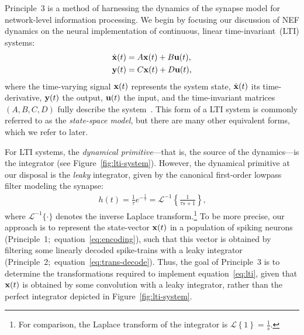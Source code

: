 Principle~3 is a method of harnessing the dynamics of the synapse model for network-level information processing.
We begin by focusing our discussion of NEF dynamics on the neural implementation of continuous, linear time-invariant~(LTI) systems:
\begin{equation} \label{eq:lti}
\begin{split}
\dot{\mathbf{x}}(t) &= A\mathbf{x}(t) + B\mathbf{u}(t) \text{,} \\
\mathbf{y}(t) &= C\mathbf{x}(t) + D\mathbf{u}(t) \text{,}
\end{split}
\end{equation}
where the time-varying signal $\mathbf{x}(t)$ represents the system state, $\dot{\mathbf{x}}(t)$ its time-derivative, $\mathbf{y}(t)$ the output, $\mathbf{u}(t)$ the input, and the time-invariant matrices $(A\text{,}\, B\text{,}\, C\text{,}\, D)$ fully describe the system~\citep{brogan1982modern}.
This form of a LTI system is commonly referred to as the \emph{state-space model}, but there are many other equivalent forms, which we refer to later.

For LTI systems, the \emph{dynamical primitive}---that is, the source of the dynamics---is the integrator (see Figure~\ref{fig:lti-system}).
However, the dynamical primitive at our disposal is the \emph{leaky} integrator, given by the canonical first-order lowpass filter modeling the synapse:
\begin{align} \label{eq:lowpass}
h(t) = \frac{1}{\tau} e^{-\frac{t}{\tau}} = \mathcal{L}^{-1}\left\{ \frac{1}{\tau s + 1} \right\} \text{,}
\end{align}
where $\mathcal{L}^{-1}\{ \cdot \}$ denotes the inverse Laplace transform.\footnote{
For comparison, the Laplace transform of the integrator is $\mathcal{L}\left\{ 1 \right\} = \frac{1}{s}$.}
To be more precise, our approach is to represent the state-vector $\mathbf{x}(t)$ in a population of spiking neurons (Principle~1;~equation~\ref{eq:encoding}), such that this vector is obtained by filtering some linearly decoded spike-trains with a leaky integrator (Principle~2;~equation~\ref{eq:trans-decode}).
Thus, the goal of Principle~3 is to determine the transformations required to implement equation~\ref{eq:lti}, given that $\mathbf{x}(t)$ is obtained by some convolution with a leaky integrator, rather than the perfect integrator depicted in Figure~\ref{fig:lti-system}.


